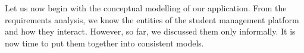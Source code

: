 %
%
Let us now begin with the conceptual modelling of our application.
From the requirements analysis, we know the entities of the student management platform and how they interact.
However, so far, we discussed them only informally.
It is now time to put them together into consistent models.%
%
%
%
\endhsection%
%
